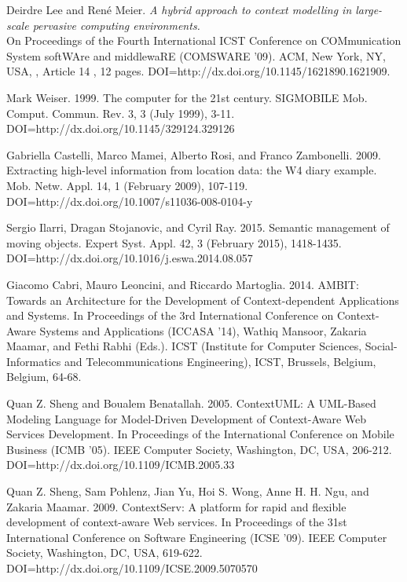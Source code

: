\documentclass[]{report}
\begin{document}
\begin{thebibliography}{99}


Deirdre Lee and René Meier. 
\textit{ A hybrid approach to context modelling in large-scale pervasive computing environments.}\\ 
On Proceedings of the Fourth International ICST Conference on COMmunication System softWAre and middlewaRE (COMSWARE '09). ACM, New York, NY, USA, , Article 14 , 12 pages. DOI=http://dx.doi.org/10.1145/1621890.1621909.

Mark Weiser. 1999. The computer for the 21st century. SIGMOBILE Mob. Comput. Commun. Rev. 3, 3 (July 1999), 3-11. DOI=http://dx.doi.org/10.1145/329124.329126

Gabriella Castelli, Marco Mamei, Alberto Rosi, and Franco Zambonelli. 2009. Extracting high-level information from location data: the W4 diary example. Mob. Netw. Appl. 14, 1 (February 2009), 107-119. DOI=http://dx.doi.org/10.1007/s11036-008-0104-y

Sergio Ilarri, Dragan Stojanovic, and Cyril Ray. 2015. Semantic management of moving objects. Expert Syst. Appl. 42, 3 (February 2015), 1418-1435. DOI=http://dx.doi.org/10.1016/j.eswa.2014.08.057
 
 
Giacomo Cabri, Mauro Leoncini, and Riccardo Martoglia. 2014. AMBIT: Towards an Architecture for the Development of Context-dependent Applications and Systems. In Proceedings of the 3rd International Conference on Context-Aware Systems and Applications (ICCASA '14), Wathiq Mansoor, Zakaria Maamar, and Fethi Rabhi (Eds.). ICST (Institute for Computer Sciences, Social-Informatics and Telecommunications Engineering), ICST, Brussels, Belgium, Belgium, 64-68.

Quan Z. Sheng and Boualem Benatallah. 2005. ContextUML: A UML-Based Modeling Language for Model-Driven Development of Context-Aware Web Services Development. In Proceedings of the International Conference on Mobile Business (ICMB '05). IEEE Computer Society, Washington, DC, USA, 206-212. DOI=http://dx.doi.org/10.1109/ICMB.2005.33

Quan Z. Sheng, Sam Pohlenz, Jian Yu, Hoi S. Wong, Anne H. H. Ngu, and Zakaria Maamar. 2009. ContextServ: A platform for rapid and flexible development of context-aware Web services. In Proceedings of the 31st International Conference on Software Engineering (ICSE '09). IEEE Computer Society, Washington, DC, USA, 619-622. DOI=http://dx.doi.org/10.1109/ICSE.2009.5070570


\end{thebibliography}
\end{document}
